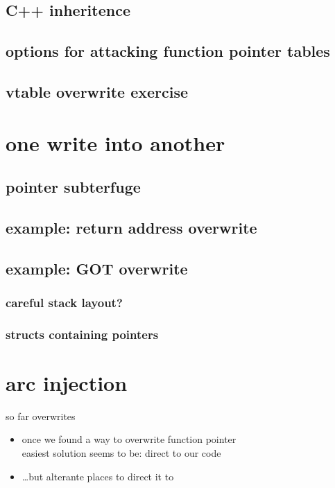 \subsection{C++ inheritence}


\subsection{options for attacking function pointer tables}


\subsection{vtable overwrite exercise}


\section{one write into another}

\subsection{pointer subterfuge}


\subsection{example: return address overwrite}


\subsection{example: GOT overwrite}


\subsubsection{careful stack layout?}


\subsubsection{structs containing pointers}


\section{arc injection}
\begin{frame}{so far overwrites}
    \begin{itemize}
    \item once we found a way to overwrite function pointer\\
          easiest solution seems to be: direct to our code
    \item \ldots but alterante places to direct it to
    \end{itemize}
\end{frame}

